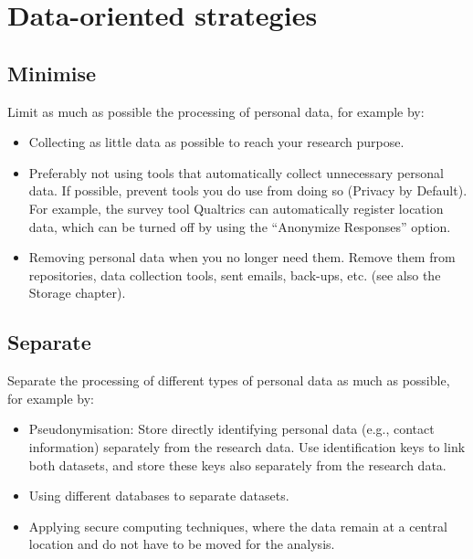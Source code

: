 \documentclass[
]{book}
\providecommand{\tightlist}{%
  \setlength{\itemsep}{0pt}\setlength{\parskip}{0pt}}
\begin{document}
\hypertarget{data-oriented-strategies}{%
\section{Data-oriented strategies}\label{data-oriented-strategies}}

\hypertarget{minimise}{%
\subsection{Minimise}\label{minimise}}

Limit as much as possible the processing of personal data, for example by:

\begin{itemize}
\tightlist
\item
  Collecting as little data as possible to reach your research purpose.
\item
  Preferably not using tools that automatically collect unnecessary personal
  data. If possible, prevent tools you do use from doing so (Privacy by Default).
  For example, the survey tool Qualtrics can automatically register location data,
  which can be turned off by using the
  ``Anonymize Responses'' option.
\item
  Removing personal data when you no longer need them. Remove them from
  repositories, data collection tools, sent emails, back-ups, etc. (see also the
  Storage chapter).
\end{itemize}

\hypertarget{separate}{%
\subsection{Separate}\label{separate}}

Separate the processing of different types of personal data as much as possible,
for example by:

\begin{itemize}
\tightlist
\item
  Pseudonymisation: Store directly
  identifying personal data (e.g., contact information) separately from the
  research data. Use identification keys to link both datasets, and store these
  keys also separately from the research data.
\item
  Using different databases to separate datasets.
\item
  Applying secure computing techniques, where
  the data remain at a central location and do not have to be moved for the analysis.
\end{itemize}
\end{document}
